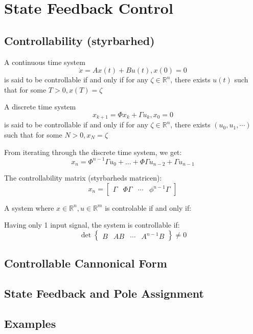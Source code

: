 \section{State Feedback Control}




\subsection{Controllability (styrbarhed)}

A continuous time system
$$ \dot{x} = Ax(t) + Bu(t), x(0)=0 $$
is said to be controllable if and only if for any $\zeta \in \mathbb{R}^n$,
there exists $u(t)$ such that for some $T>0, x(T)=\zeta$




A discrete time system
$$x_{k+1} = \Phi x_k + \Gamma u_k, x_0=0$$
is said to be controllable if and only if for any $\zeta \in \mathbb{R}^n$, there exists
$(u_0, u_1, \cdots)$ such that for some $N>0, x_N=\zeta$

From iterating through the discrete time system, we get:
$$ x_n = \Phi^{n-1} \Gamma u_0 + \dots + \Phi \Gamma u_{n-2} + \Gamma u_{n-1} $$

The controllability matrix (styrbarheds matricen):
$$ x_n = \begin{bmatrix}  \Gamma & \Phi \Gamma & \cdots & \phi ^{n-1} \Gamma \end{bmatrix} $$

A system where $x \in \mathbb{R}^n, u \in \mathbb{R}^m$ is controlable if and only if:



Having only 1 input signal, the system is controllable if:
$$ \det \begin{Bmatrix} B & AB & \cdots & A^{n-1}B \end{Bmatrix} \neq 0 $$




\subsection{Controllable Cannonical Form}
\subsection{State Feedback and Pole Assignment}










\subsection{Examples}
